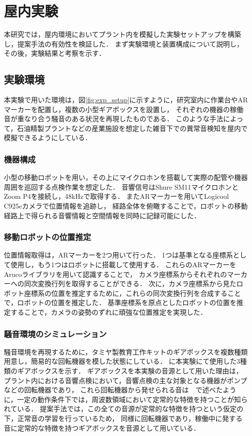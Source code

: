 \documentclass[../main]{subfiles}
\begin{document}
\section{屋内実験} \label{sec:vexp_spectral-reflectance}

本研究では，屋内環境においてプラント内を模擬した実験セットアップを構築し，提案手法の有効性を検証した．
まず実験環境と装置構成について説明し，その後，実験結果と考察を示す．

\subsection{実験環境} \label{subsec:vexp_ref_environmet}

本実験で用いた環境は，図\ref{fig:exp_setup}に示すように，研究室内に作業台やARマーカーを配置し，複数の小型ギアボックスを設置し，
それぞれの機器の稼働音が重なり合う騒音のある状況を再現したものである．
このような手法によって，石油精製プラントなどの産業施設を想定した雑音下での異常音検知を屋内で模擬できるようにしている．

\subsubsection{機器構成} \label{subsubsec:device_config}

小型の移動ロボットを用い，その上にマイクロホンを搭載して実際の配管や機器周囲を巡回する点検作業を想定した．
音響信号はShure SM11マイクロホンとZoom P4を接続し，48kHzで取得する．
またARマーカーを用いてLogicool C925eカメラで位置情報を追跡し，
経路全体を俯瞰することで，ロボットの移動経路上で得られる音響情報と空間情報を同時に記録可能にした．

\subsubsection{移動ロボットの位置推定}
位置情報取得は，ARマーカーを2つ用いて行った．
1つは基準となる座標系として使用し，もう1つはロボットに搭載して使用する．
これらのARマーカーをArucoライブラリを用いて認識することで，
カメラ座標系からそれぞれのマーカーへの同次変換行列を取得することができる．
次に，カメラ座標系から見たロボット座標系の位置を推定するために，これらの同次変換行列を合成することで，ロボットの位置を推定した．
基準座標系を原点としたロボットの位置を推定することで，カメラの姿勢のずれに頑強な位置推定を実現した．
\subsubsection{騒音環境のシミュレーション} \label{subsubsec:noise_simulation}
騒音環境を再現するために，タミヤ製教育工作キットのギアボックスを複数種類用意し，簡易的な回転機器を模した状態にしている．
に本実験にて使用した3種類のギアボックスを示す．
ギアボックスを本実験の音源として用いた理由は，プラント内における音響点検において，音響点検の主な対象となる機器がポンプなどの回転機器であり，
これら回転機器から発せられる音は　で述べたように，一定の動作条件下では，周波数領域において定常的な特徴を持つことが知られている．
提案手法では，この全ての音源が定常的な特徴を持つという仮定の下，正常音の学習を行っているため，
同様に回転機器であり，稼働中に発する音に定常的な特徴を持つギアボックスを音源として用いている．
\end{document}
